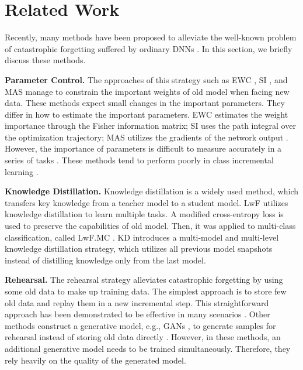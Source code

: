 \documentclass[10pt,twocolumn,letterpaper]{article}
\begin{document}
\section{Related Work}\label{sec:related}
Recently, many methods have been proposed to alleviate the well-known problem of catastrophic forgetting \cite{French1999CatastrophicFI,MichaelCatastrophic} suffered by ordinary DNNs . In this section, we briefly discuss these methods.

\textbf{Parameter Control.} The approaches of this strategy such as EWC \cite{kirkpatrick2017overcoming}, SI \cite{zenke2017continual}, and MAS \cite{aljundi2018memory} manage to constrain the important weights of old model when facing new data. These methods expect small changes in the important parameters. They differ in how to estimate the important parameters. EWC estimates the weight importance through the Fisher information matrix; SI uses the path integral over the optimization trajectory; MAS utilizes the gradients of the network output \cite{zhang2019class}. However, the importance of parameters is difficult to measure accurately in a series of tasks \cite{hou2019learning}. These methods tend to perform poorly in class incremental learning \cite{hsu2018re,DBLP:journals/corr/abs-1904-07734}.

\textbf{Knowledge Distillation.} Knowledge distillation \cite{hinton2015distilling} is a widely used method, which transfers key knowledge from a teacher model to a student model. LwF \cite{li2017learning} utilizes knowledge distillation to learn multiple tasks. A modified cross-entropy loss is used to preserve the capabilities of old model. Then, it was applied to multi-class classification, called LwF.MC \cite{rebuffi2017icarl}. KD \cite{zhou2019m2kd} introduces a multi-model and multi-level knowledge distillation strategy, which utilizes all previous model snapshots instead of distilling knowledge only from the last model.

\textbf{Rehearsal.} The rehearsal strategy alleviates catastrophic forgetting by using some old data to make up training data. The simplest approach is to store few old data and replay them in a new incremental step. This straightforward approach has been demonstrated to be effective in many scenarios \cite{hsu2018re,DBLP:journals/corr/abs-1904-07734}. Other methods construct a generative model, e.g., GANs \cite{goodfellow2014generative}, to generate samples for rehearsal instead of storing old data directly \cite{farquhar2019unifying,shin2017continual,Wu2018IncrementalCL}. However, in these methods, an additional generative model needs to be trained simultaneously. Therefore, they rely heavily on the quality of the generated model.
\end{document}
